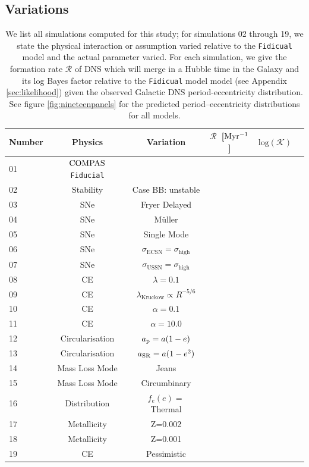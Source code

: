 \documentclass[a4paper,fleqn,usenatbib]{mnras}
\newcommand\rate{\mathcal{R}}
\begin{document}
\subsection{Variations}
\begin{table}
\caption{
We list all simulations computed for this study; for simulations 02 through 19, we state the physical interaction or assumption varied relative to the \texttt{Fidicual} model and the actual parameter varied.
For each simulation, we give the formation rate $\rate$ of DNS which will merge in a Hubble time in the Galaxy and its log Bayes factor relative to the \texttt{Fidicual} model model (see Appendix \ref{sec:likelihood}) given the observed Galactic DNS period-eccentricity distribution.
See figure \ref{fig:nineteenpanels} for the predicted period--eccentricity distributions for all models.
}
\label{tab:models}
\begin{tabular}{lccccc}
\hline
Number & Physics & Variation  & $\rate$~[\textrm{$\rm Myr^{-1}$}]	& $\textrm{log}(\mathcal{K})$ \\
\hline
01 & $\rm COMPAS$ \texttt{Fiducial} & &  &  \\
02 & Stability & Case BB: unstable &  &  \\
03 & SNe & Fryer Delayed &  &  \\
04 & SNe & M\"uller &&  \\
05 & SNe & Single Mode & & \\
06 & SNe & $\sigma_{\textrm{ECSN}}=\sigma_{\textrm{high}}$  & & \\
07 & SNe & $\sigma_{\textrm{USSN}}=\sigma_{\textrm{high}}$  & & \\
08 & CE & $\lambda=0.1$  & & \\
09 & CE & $\lambda_{\textrm{Kruckow}}\propto R^{-5/6}$  & & \\
10 & CE & $\alpha=0.1$  & & \\
11 & CE & $\alpha=10.0$  & & \\
12 & Circularisation & $a_{\rm p}=a(1-e)$  & & \\
13 & Circularisation & $a_{\rm SR}=a(1-e^2)$  & &\\
14 & Mass Loss Mode & Jeans  & & \\
15 & Mass Loss Mode & Circumbinary  & & \\
16 & Distribution & $f_{e}(e)=$ Thermal  & & \\
17 & Metallicity & Z=0.002  & & \\
18 & Metallicity & Z=0.001 & & \\
19 & CE & Pessimistic  & & \\
\hline
\end{tabular}
\end{table}
\end{document}
